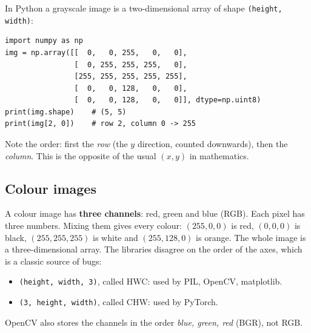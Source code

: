In Python a grayscale image is a two-dimensional array of shape \texttt{(height, width)}:
\begin{verbatim}
import numpy as np
img = np.array([[  0,   0, 255,   0,   0],
                [  0, 255, 255, 255,   0],
                [255, 255, 255, 255, 255],
                [  0,   0, 128,   0,   0],
                [  0,   0, 128,   0,   0]], dtype=np.uint8)
print(img.shape)    # (5, 5)
print(img[2, 0])    # row 2, column 0 -> 255
\end{verbatim}
Note the order: first the \emph{row} (the $y$ direction, counted downwards), then the \emph{column}. This is the opposite of the usual $(x,y)$ in mathematics.

\subsection*{Colour images}
A colour image has \textbf{three channels}: red, green and blue (RGB). Each pixel has three numbers. Mixing them gives every colour: $(255,0,0)$ is red, $(0,0,0)$ is black, $(255,255,255)$ is white and $(255,128,0)$ is orange. The whole image is a three-dimensional array. The libraries disagree on the order of the axes, which is a classic source of bugs:
\begin{itemize}[nosep]
  \item \texttt{(height, width, 3)}, called HWC: used by PIL, OpenCV, matplotlib.
  \item \texttt{(3, height, width)}, called CHW: used by PyTorch.
\end{itemize}
OpenCV also stores the channels in the order \emph{blue, green, red} (BGR), not RGB.

\begin{center}
\label{fig:ai2_rgb}
\end{center}

